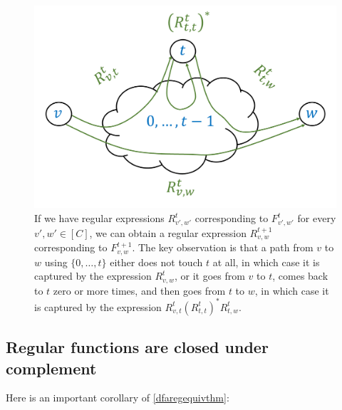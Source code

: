 \begin{figure}
\centering
\includegraphics[width=\textwidth, height=0.25\paperheight, keepaspectratio]{../figure/dfatoreginduction.png}
\caption{If we have regular expressions \(R_{v',w'}^{t}\) corresponding
to \(F_{v',w'}^{t}\) for every \(v',w' \in [C]\), we can obtain a
regular expression \(R_{v,w}^{t+1}\) corresponding to \(F_{v,w}^{t+1}\).
The key observation is that a path from \(v\) to \(w\) using
\(\{0,\ldots, t \}\) either does not touch \(t\) at all, in which case
it is captured by the expression \(R_{v,w}^{t}\), or it goes from \(v\)
to \(t\), comes back to \(t\) zero or more times, and then goes from
\(t\) to \(w\), in which case it is captured by the expression
\(R_{v,t}^{t}(R_{t,t}^{t})^* R_{t,w}^t\).}
\label{dfatoreginductivefig}
\end{figure}

\subsection{Regular functions are closed under
complement}\label{Regular-functions-are-clo}

Here is an important corollary of \cref{dfaregequivthm}:

\hypertarget{regcomplementlem}{}

